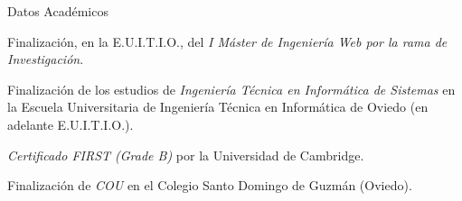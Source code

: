 
\begin{rubric}{Datos Académicos}

  \entry*[2008]
  Finalización, en la E.U.I.T.I.O., del \emph{I Máster de Ingeniería Web por la rama de Investigación}.

  \entry*[2006]
  Finalización de los estudios de \emph{Ingeniería Técnica en Informática de Sistemas} en la Escuela Universitaria de Ingeniería Técnica en Informática de Oviedo (en adelante E.U.I.T.I.O.).

  \entry*[2005]
  \emph{Certificado FIRST (Grade B)} por la Universidad de Cambridge.

  \entry*[2001]
  Finalización de \emph{COU} en el Colegio Santo Domingo de Guzmán (Oviedo).

\end{rubric}


